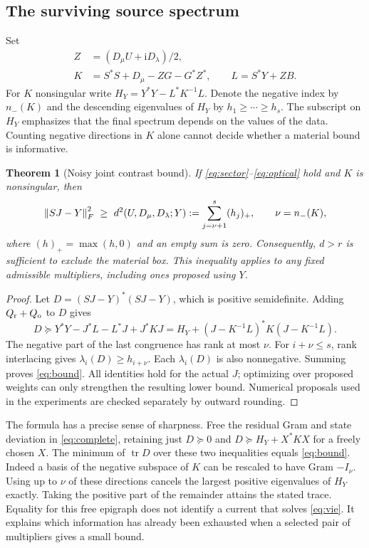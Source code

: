 \documentclass[anonymous,12pt]{iopjournal}
\newtheorem{theorem}{Theorem}[section]
\theoremstyle{remark}\newtheorem{remark}[theorem]{Remark}
\newcommand{\tr}{\operatorname{tr}}\newcommand{\diag}{\operatorname{diag}}
\newcommand{\Dpos}{D_{\mu}}\newcommand{\Dopt}{D_{\lambda}}
\numberwithin{equation}{section}
\begin{document}
\subsection{The surviving source spectrum}
Set
\begin{align}
 Z&=(\Dpos U+\mathrm i\Dopt)/2,\nonumber\\
 K&=S^*S+\Dpos-ZG-G^*Z^*,\qquad L=S^*Y+ZB. \label{eq:operators}
\end{align}
For $K$ nonsingular write $H_Y=Y^*Y-L^*K^{-1}L$. Denote the negative index by $n_-(K)$ and the descending eigenvalues of $H_Y$ by $h_1\ge\cdots\ge h_s$. The subscript on $H_Y$ emphasizes that the final spectrum depends on the values of the data. Counting negative directions in $K$ alone cannot decide whether a material bound is informative.

\begin{theorem}[Noisy joint contrast bound]\label{th:bound}
If \eqref{eq:sector}--\eqref{eq:optical} hold and $K$ is nonsingular, then
\begin{equation}
 \norm{SJ-Y}_F^2\ \ge\ d^2(U,\Dpos,\Dopt;Y)
   :=\sum_{j=\nu+1}^{s}(h_j)_+,\qquad \nu=n_-(K), \label{eq:bound}
\end{equation}
where $(h)_+=\max(h,0)$ and an empty sum is zero. Consequently, $d>r$ is sufficient to exclude the material box. This inequality applies to any fixed admissible multipliers, including ones proposed using $Y$.
\end{theorem}
\begin{proof}
Let $D=(SJ-Y)^*(SJ-Y)$, which is positive semidefinite. Adding $Q_{\rm r}+Q_{\rm o}$ to $D$ gives
\begin{equation}
 D\succeq Y^*Y-J^*L-L^*J+J^*KJ
 =H_Y+(J-K^{-1}L)^*K(J-K^{-1}L).\label{eq:complete}
\end{equation}
The negative part of the last congruence has rank at most $\nu$. For $i+\nu\le s$, rank interlacing gives $\lambda_i(D)\ge h_{i+\nu}$. Each $\lambda_i(D)$ is also nonnegative. Summing proves \eqref{eq:bound}. All identities hold for the actual $J$; optimizing over proposed weights can only strengthen the resulting lower bound. Numerical proposals used in the experiments are checked separately by outward rounding.
\end{proof}

The formula has a precise sense of sharpness. Free the residual Gram and state deviation in \eqref{eq:complete}, retaining just $D\succeq0$ and $D\succeq H_Y+X^*KX$ for a freely chosen $X$. The minimum of $\tr D$ over these two inequalities equals \eqref{eq:bound}. Indeed a basis of the negative subspace of $K$ can be rescaled to have Gram $-I_\nu$. Using up to $\nu$ of these directions cancels the largest positive eigenvalues of $H_Y$ exactly. Taking the positive part of the remainder attains the stated trace. Equality for this free epigraph does not identify a current that solves \eqref{eq:vie}. It explains which information has already been exhausted when a selected pair of multipliers gives a small bound.
\end{document}
